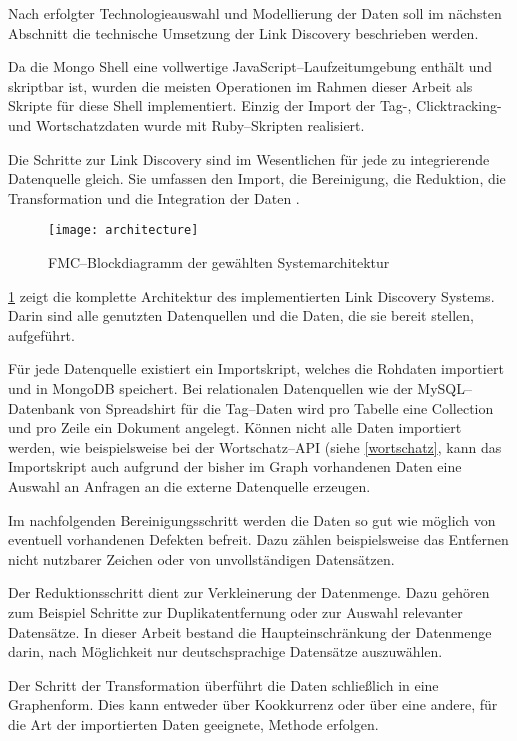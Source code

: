 Nach erfolgter Technologieauswahl und Modellierung der Daten soll im nächsten Abschnitt die technische Umsetzung der Link Discovery beschrieben werden.

Da die Mongo Shell eine vollwertige JavaScript--Laufzeitumgebung enthält und skriptbar ist, wurden die meisten Operationen im Rahmen dieser Arbeit als Skripte für diese Shell implementiert. Einzig der Import der Tag-, Clicktracking- und Wortschatzdaten wurde mit Ruby--Skripten realisiert.

Die Schritte zur Link Discovery sind im Wesentlichen für jede zu integrierende Datenquelle gleich. Sie umfassen den Import, die Bereinigung, die Reduktion, die Transformation und die Integration der Daten \cite{hkp2012}.

\begin{figure}
\centering
\texttt{[image: architecture]}
\caption{FMC--Blockdiagramm der gewählten Systemarchitektur}
\label{fig:architecture}
\end{figure}

\cref{fig:architecture} zeigt die komplette Architektur des implementierten Link Discovery Systems. Darin sind alle genutzten Datenquellen und die Daten, die sie bereit stellen, aufgeführt.

Für jede Datenquelle existiert ein Importskript, welches die Rohdaten importiert und in MongoDB speichert. Bei relationalen Datenquellen wie der MySQL--Datenbank von Spreadshirt für die Tag--Daten wird pro Tabelle eine Collection und pro Zeile ein Dokument angelegt. Können nicht alle Daten importiert werden, wie beispielsweise bei der Wortschatz--API (siehe \cref{wortschatz}, kann das Importskript auch aufgrund der bisher im Graph vorhandenen Daten eine Auswahl an Anfragen an die externe Datenquelle erzeugen.

Im nachfolgenden Bereinigungsschritt werden die Daten so gut wie möglich von eventuell vorhandenen Defekten befreit. Dazu zählen beispielsweise das Entfernen nicht nutzbarer Zeichen oder von unvollständigen Datensätzen.

Der Reduktionsschritt dient zur Verkleinerung der Datenmenge. Dazu gehören zum Beispiel Schritte zur Duplikatentfernung oder zur Auswahl relevanter Datensätze. In dieser Arbeit bestand die Haupteinschränkung der Datenmenge darin, nach Möglichkeit nur deutschsprachige Datensätze auszuwählen.

Der Schritt der Transformation überführt die Daten schließlich in eine Graphenform. Dies kann entweder über Kookkurrenz oder über eine andere, für die Art der importierten Daten geeignete, Methode erfolgen.

